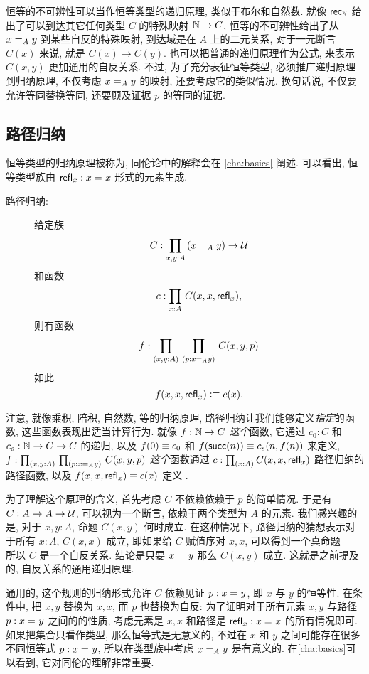 恒等的不可辨性可以当作恒等类型的递归原理, 类似于布尔和自然数.
就像 $\rec{\nat}$ 给出了可以到达其它任何类型 $C$ 的特殊映射 $\nat\to C$, 恒等的不可辨性给出了从 $\id[A] x y$ 到某些自反的特殊映射, 到达域是在 $A$ 上的二元关系, 对于一元断言 $C(x)$ 来说, 就是 $C(x) \to C(y)$.
也可以把普通的递归原理作为公式, 来表示 $C(x,y)$ 更加通用的自反关系.
不过, 为了充分表征恒等类型, 必须推广递归原理到归纳原理, 不仅考虑 $\id[A] x y$ 的映射, 还要考虑它的类似情况.
换句话说, 不仅要允许等同替换等同, 还要顾及证据 $p$ 的等同的证据.

\subsection{路径归纳}

恒等类型的归纳原理被称为, %
%
同伦论中的解释会在 \cref{cha:basics} 阐述.
可以看出, 恒等类型族由 $\refl{x}: \id{x}{x}$ 形式的元素生成.

\begin{description}
    \item[路径归纳:]
    给定族
    \[ C : \prd{x,y:A} (\id[A]{x}{y}) \to \UU \]
    和函数
    \[ c : \prd{x:A} C(x,x,\refl{x}),\]
    则有函数
    \[ f : \prd{x,y:A}{p:\id[A]{x}{y}} C(x,y,p) \]
    如此
    \[ f(x,x,\refl{x}) \defeq c(x). \]
\end{description}

注意, 就像乘积, 陪积, 自然数, 等的归纳原理, 路径归纳让我们能够定义\emph{指定}的函数, 这些函数表现出适当计算行为.
就像 $f:\nat\to C$ \emph{这个}函数, 它通过 $c_0:C$ 和 $c_s:\nat \to C \to C$ 的递归, 以及 $f(0)\jdeq c_0$ 和 $f(\suc(n))\jdeq c_s(n,f(n))$ 来定义, $f : \dprd{x,y:A}{p:\id[A]{x}{y}} C(x,y,p)$ \emph{这个}函数通过 $c : \prd{x:A} C(x,x,\refl{x})$ 路径归纳的路径函数, 以及 $f(x,x,\refl{x}) \jdeq c(x)$ 定义 .

为了理解这个原理的含义, 首先考虑 $C$ 不依赖依赖于 $p$ 的简单情况.
于是有 $C:A\to A\to \UU$, 可以视为一个断言, 依赖于两个类型为 $A$ 的元素.
我们感兴趣的是, 对于 $x,y:A$, 命题 $C(x,y)$ 何时成立.
在这种情况下, 路径归纳的猜想表示对于所有 $x:A$, $C(x,x)$ 成立, 即如果给 $C$ 赋值序对 $x, x$, 可以得到一个真命题 --- 所以 $C$ 是一个自反关系.
结论是只要 $\id{x}{y}$ 那么 $C(x,y)$ 成立.
这就是之前提及的, 自反关系的通用递归原理.

通用的, 这个规则的归纳形式允许 $C$ 依赖见证 $p:\id{x}{y}$, 即 $x$ 与 $y$ 的恒等性.
在条件中, 把 $x, y$ 替换为 $x,x$, 而 $p$ 也替换为自反: 为了证明对于所有元素 $x,y$ 与路径 $p : \id{x}{y}$ 之间的的性质, 考虑元素是 $x,x$ 和路径是 $\refl{x}: \id{x}{x}$ 的所有情况即可.
如果把集合只看作类型, 那么恒等式是无意义的, 不过在 $x$ 和 $y$ 之间可能存在很多不同恒等式 $p : \id{x}{y}$, 所以在类型族中考虑 $\id[A]{x}{y}$ 是有意义的.
在\cref{cha:basics}可以看到, 它对同伦的理解非常重要.

